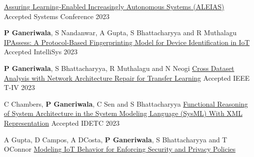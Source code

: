 \begin{cventries}
{\href{https://ieeexplore.ieee.org/abstract/document/10131227}{Assuring Learning-Enabled Increasingly Autonomous Systems (ALEIAS)}}
{Accepted}
{Systems Conference 2023} 
{ %
\begin{cvitems}
\end{cvitems}
}
\cventry
{\textbf{P Ganeriwala}, S Nandanwar, A Gupta, S Bhattacharyya and R Muthalagu}
{\href{https://link.springer.com/chapter/10.1007/978-3-031-47715-7_46}{IPAssess: A Protocol-Based Fingerprinting Model for Device Identification in IoT}}
{Accepted}
{IntelliSys 2023} 
{ %
\begin{cvitems}
\end{cvitems}
}
\cventry
{\textbf{P Ganeriwala}, S Bhattacharyya, R Muthalagu and N Neogi}
{\href{https://ieeexplore.ieee.org/abstract/document/10186721}{Cross Dataset Analysis with Network Architecture Repair for Transfer Learning}}
{Accepted}
{IEEE T-IV 2023} 
{ %
\begin{cvitems}
\end{cvitems}
}
\cventry
{C Chambers, \textbf{P Ganeriwala}, C Sen and S Bhattacharyya}
{\href{https://asmedigitalcollection.asme.org/IDETC-CIE/proceedings-abstract/IDETC-CIE2023/87295/1170388}{Functional Reasoning of System Architecture in the System Modeling Language (SysML) With XML Representation}}
{Accepted}
{IDETC 2023} 
{ %
\begin{cvitems}
\end{cvitems}
}
\cventry
{A Gupta, D Campos, A DCosta, \textbf{P Ganeriwala}, S Bhattacharyya and T OConnor}
{\href{https://link.springer.com/chapter/10.1007/978-3-031-37717-4_95}{Modeling IoT Behavior for Enforcing Security and Privacy Policies}}

\end{cventries}
